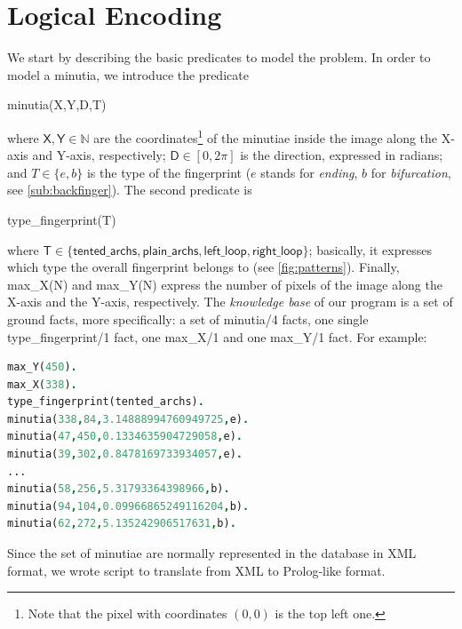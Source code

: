 \documentclass[8pt]{article}
\begin{document}
\section{Logical Encoding}
\label{sec:logicalencoding}
We start by describing the basic predicates to model the problem. In order to
model a minutia, we introduce the predicate
  \begin{center}
    \textsf{minutia(X,Y,D,T)}
  \end{center}
where $\textsf{X},\textsf{Y} \in \mathbb{N}$ are the coordinates\footnote{Note 
that the pixel with coordinates $(0,0)$ is the top left one.}
of the minutiae inside the image along the X-axis and Y-axis, respectively;
$\textsf{D} \in [0,2\pi]$ is the direction, expressed in radians; 
and $T \in \{e,b\}$ is the type of the fingerprint ($e$ stands for
\emph{ending}, $b$ for \emph{bifurcation}, see \cref{sub:backfinger}).
The second predicate is
  \begin{center}
    \textsf{type\_fingerprint(T)}
  \end{center}
where $\textsf{T}\in\{
  \textsf{tented\_archs},
  \textsf{plain\_archs},
  \textsf{left\_loop},
  \textsf{right\_loop}
\}$; 
basically, it expresses which type the overall fingerprint belongs to (see
\cref{fig:patterns}).  Finally, \textsf{max\_X(N)} and \textsf{max\_Y(N)}
express the number of pixels of the image along the X-axis and the Y-axis,
respectively.  The \emph{knowledge base} of our program is a set of ground
facts, more specifically: a set of \textsf{minutia/4} facts, one single
\textsf{type\_fingerprint/1} fact, one \textsf{max\_X/1} and one
\textsf{max\_Y/1} fact. For example:
  \begin{center}
  \begin{lstlisting}[language=Prolog,frame = single,basicstyle=\footnotesize\ttfamily]
max_Y(450).
max_X(338).
type_fingerprint(tented_archs).
minutia(338,84,3.14888994760949725,e).
minutia(47,450,0.1334635904729058,e).
minutia(39,302,0.8478169733934057,e).
...
minutia(58,256,5.31793364398966,b).
minutia(94,104,0.09966865249116204,b).
minutia(62,272,5.135242906517631,b).
  \end{lstlisting}
  \end{center}
Since the set of minutiae are normally represented in the database in XML
format, we wrote script to translate from XML to Prolog-like format.
\end{document}

